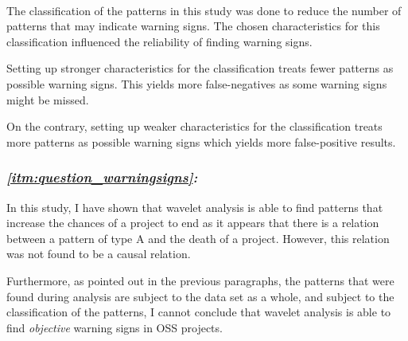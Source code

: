 \paragraph{}
The classification of the patterns in this study was done to reduce the
number of patterns that may indicate warning signs. The chosen characteristics
for this classification influenced the reliability of finding warning signs.

Setting up stronger characteristics for the classification treats fewer
patterns as possible warning signs. This yields more false-negatives as some
warning signs might be missed.

On the contrary, setting up weaker characteristics for the classification treats
more patterns as possible warning signs which yields more false-positive
results.

\subsubsection{\textit{\ref{itm:question_warningsigns}: \researchQuestion}}
In this study, I have shown that wavelet analysis is able to find patterns that
increase the chances of a project to end as it appears that there is a relation
between a pattern of type A and the death of a project. However, this relation
was not found to be a causal relation.

Furthermore, as pointed out in the previous paragraphs, the patterns that were
found during analysis are subject to the data set as a whole, and subject to
the classification of the patterns, I cannot conclude that wavelet analysis is
able to find \textit{objective} warning signs in OSS projects.

